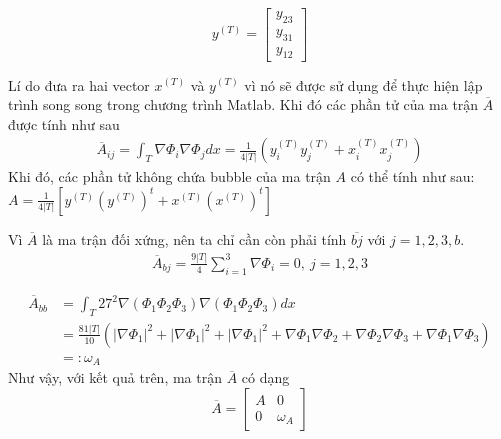 \documentclass[14pt]{extreport}
\begin{document}
{\[
y^{(T)}
=
\begin{bmatrix}
    y_{23} \\
    y_{31} \\
    y_{12}
\end{bmatrix}
\]

Lí do đưa ra hai vector $x^{(T)}$ và $y^{(T)}$ vì nó sẽ được sử dụng để thực hiện lập trình song song trong chương trình Matlab. Khi đó các phần tử của ma trận $\overline{A}$ được tính như sau
\begin{equation} \label{eq22}
\begin{split}
\overline{A}_{ij} = \int_T \nabla \Phi_i \nabla \Phi_j dx = \frac{1}{4|T|} (y_i^{(T)} y_j^{(T)} + x_i^{(T)} x_j^{(T)})
\end{split}
\end{equation}
Khi đó, các phần tử không chứa bubble của ma trận $A$ có thể tính như sau:
$A = \frac{1}{4|T|} \left[ y^{(T)}(y^{(T)})^t + x^{(T)}(x^{(T)})^t \right]$

Vì $\overline{A}$ là ma trận đối xứng, nên ta chỉ cần còn phải tính $\overline{bj}$ với $j = 1,2,3,b$.
\begin{equation} \label{eq23}
\begin{split}
\overline{A}_{bj} =\frac{9|T|}{4} \sum_{i=1}^3 \nabla \Phi_i = 0, \ j =1,2,3
\end{split}
\end{equation}

\begin{equation} \label{eq24}
\begin{split}
\overline{A}_{bb} & = \int_T 27^2 \nabla(\Phi_1 \Phi_2 \Phi_3) \nabla(\Phi_1 \Phi_2 \Phi_3) dx \\
& = \frac{81 |T|}{10} (|\nabla \Phi_1|^2 + |\nabla \Phi_1|^2 + |\nabla \Phi_1|^2 + \nabla \Phi_1\nabla \Phi_2 + \nabla \Phi_2\nabla \Phi_3 + \nabla \Phi_1\nabla \Phi_3) \\
& =: \omega_A
\end{split}
\end{equation}
Như vậy, với kết quả trên, ma trận $\overline{A}$ có dạng
\[
\overline{A} = 
\begin{bmatrix}
A & 0 \\
0 & \omega_A
\end{bmatrix}
\]

}
\end{document}
